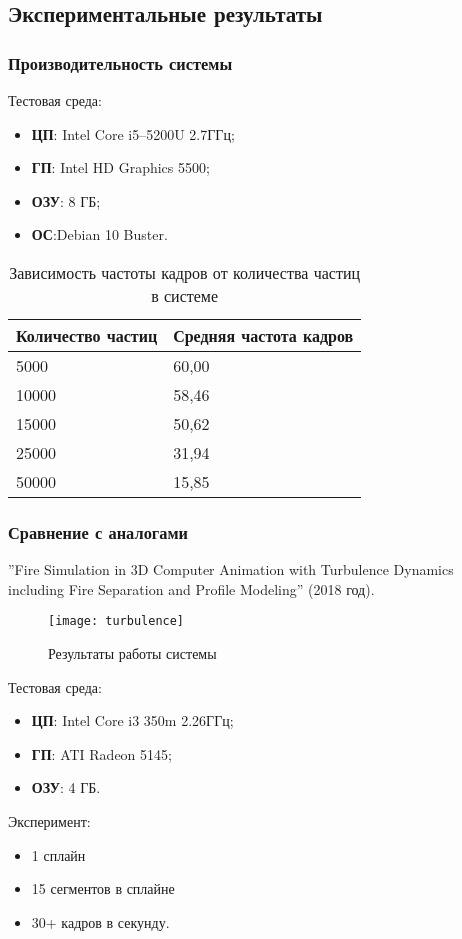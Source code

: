 \subsection{Экспериментальные результаты}
\begin{frame}
\frametitle{Производительность системы}
Тестовая среда:
\begin{itemize}
    \item \textbf{ЦП}: Intel Core i5--5200U 2.7ГГц;
    \item \textbf{ГП}: Intel HD Graphics 5500;
    \item \textbf{ОЗУ}: 8 ГБ;
    \item \textbf{ОС}:Debian 10 Buster.
\end{itemize}

\begin{table}[htb]
\caption{Зависимость частоты кадров от количества частиц в системе}%
\label{table:amountBench}
\centering
\small
\begin{tabular}{| l | l |}
    \hline
    Количество частиц & Средняя частота кадров \\
    \hline
    5000 &  60,00 \\
    \hline
    10000 & 58,46 \\
    \hline
    15000 & 50,62 \\
    \hline
    25000 & 31,94 \\
    \hline
    50000 & 15,85 \\
    \hline
\end{tabular}
\end{table}
\end{frame}

\begin{frame}[allowframebreaks]
\frametitle{Сравнение с аналогами}
''Fire Simulation
in 3D Computer Animation with Turbulence Dynamics including Fire Separation and
Profile Modeling'' (2018 год).
\begin{figure}[htb]
	\centering
    \texttt{[image: turbulence]}
    \caption{Результаты работы системы}%
    \label{fig:turbulence}
\end{figure}

Тестовая среда:
\begin{itemize}
    \item \textbf{ЦП}: Intel Core i3 350m 2.26ГГц;
    \item \textbf{ГП}: ATI Radeon 5145;
    \item \textbf{ОЗУ}: 4 ГБ.
\end{itemize}

Эксперимент:
\begin{itemize}
    \item 1 сплайн
    \item 15 сегментов в сплайне
    \item 30+ кадров в секунду.
\end{itemize}
\end{frame}


